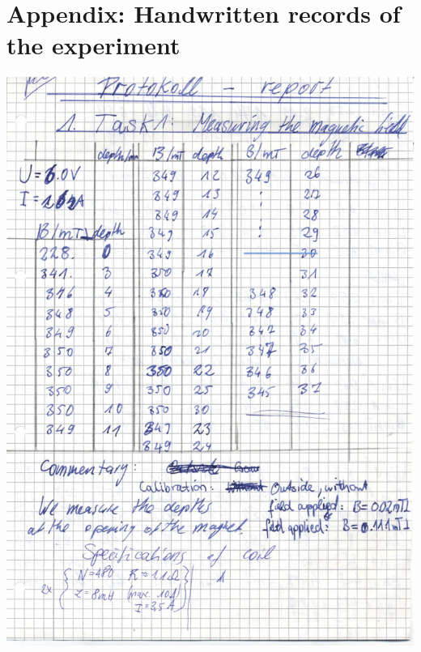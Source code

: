 \section{Appendix: Handwritten records of the experiment}
\label{sec:appendix}
    \includegraphics[width=\linewidth]{appendix/spin1.jpg}
\clearpage
